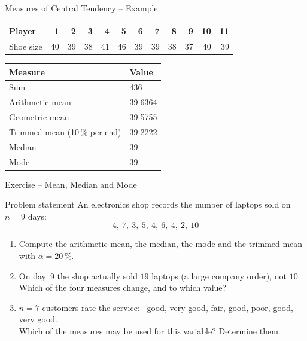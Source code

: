 \documentclass[aspectratio=169,11pt]{beamer}
\begin{document}
\begin{frame}{Measures of Central Tendency -- Example}
  \begin{center}
    \begin{tabular}{l*{11}{r}}
      \toprule
      Player & 1 & 2 & 3 & 4 & 5 & 6 & 7 & 8 & 9 & 10 & 11 \\
      \midrule
      Shoe size & 40 & 39 & 38 & 41 & 46 & 39 & 39 & 38 & 37 & 40 & 39 \\
      \bottomrule
    \end{tabular}
  \end{center}

  \begin{center}
    \begin{tabular}{ll}
      \toprule
      \textbf{Measure} & \textbf{Value} \\
      \midrule
      Sum & 436 \\
      Arithmetic mean & 39.6364 \\
      Geometric mean & 39.5755 \\
      Trimmed mean (10\,\% per end) & 39.2222 \\
      Median & 39 \\
      Mode & 39 \\
      \bottomrule
    \end{tabular}
  \end{center}
\end{frame}

\begin{frame}{Exercise -- Mean, Median and Mode}
  \begin{block}{Problem statement}
    An electronics shop records the number of laptops sold on $n = 9$ days:
    \[ 4,\ 7,\ 3,\ 5,\ 4,\ 6,\ 4,\ 2,\ 10 \]
    \begin{enumerate}
      \item[a)] Compute the arithmetic mean, the median, the mode and the trimmed mean
        with $\alpha = 20\,\%$.
      \item[b)] On day~9 the shop actually sold $19$ laptops (a large company order), not $10$.
        Which of the four measures change, and to which value?
      \item[c)] $n = 7$ customers rate the service: \ good, very good, fair, good, poor, good,
        very good.\\ Which of the measures may be used for this variable? Determine them.
    \end{enumerate}
  \end{block}
\end{frame}
\end{document}
